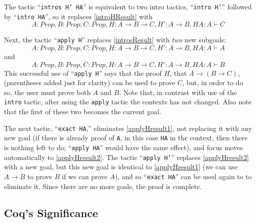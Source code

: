\documentclass[11pt]{amsart}
\newcommand{\ra}{\ensuremath{\rightarrow}}
\begin{document}

The tactic ``\texttt{intros H' HA}'' is equivalent to two intro tactics, ``\texttt{intro H'}'' followed by ``\texttt{intro HA}'', so it replaces \eqref{introHResult} with
\begin{equation}\label{introsResult}A : Prop, B : Prop, C : Prop, H : A \ra B \ra C, H' : A \ra B,  HA : A \vdash C\end{equation}

Next, the tactic ``\texttt{apply H}'' replaces \eqref{introsResult} with \textit{two} new subgoals:
\begin{equation}\label{applyHresult1}A : Prop, B : Prop, C : Prop, H : A \ra B \ra C, H' : A \ra B,  HA : A \vdash A\end{equation}
and
\begin{equation}\label{applyHresult2}A : Prop, B : Prop, C : Prop, H : A \ra B \ra C, H' : A \ra B,  HA : A \vdash B\end{equation}
This successful use of ``\texttt{apply H}'' says that the proof $H$, that $A \ra (B \ra C)$, (parentheses added just for clarity) can be used to prove $C$, but, in order to do so, the user must prove both $A$ and $B$.  Note that, in contrast with use of the \texttt{intro} tactic, after using the \texttt{apply} tactic the contexts has not changed.  Also note that the first of these two becomes the current goal.

The next tactic, ``\texttt{exact HA},'' eliminates \eqref{applyHresult1}, not replacing it with any new goal (if there is already proof of \texttt{A}, in this case \texttt{HA} in the context, then there is nothing left to do;  ``\texttt{apply HA}'' would have the same effect), and focus moves automatically to \eqref{applyHresult2}.  The tactic ``\texttt{apply H'}'' replaces \eqref{applyHresult2} with a new goal, but this new goal is identical to \eqref{applyHresult1} (we can use $A \ra B$ to prove $B$ if we can prove $A$), and so ``\texttt{exact HA}'' can be used again to to eliminate it.  Since there are no more goals, the proof is complete.

\subsection{Coq's Significance}
\end{document}
